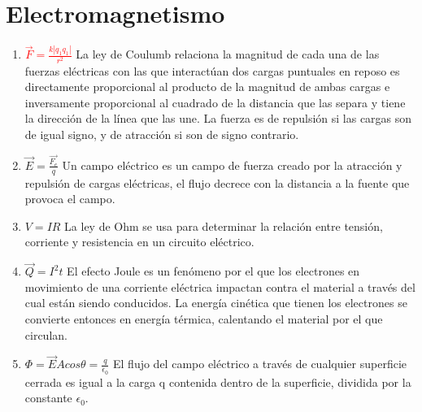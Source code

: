\documentclass[a4paper, 12pt]{article}
\begin{document}
\section{Electromagnetismo}
\begin{enumerate}
    \item [\diamond] \textcolor{red}{$\vec{F}=\frac{k|q_{1}q_{1}|}{r^{2}}$} La ley de Coulumb relaciona la magnitud de cada una de las fuerzas eléctricas con las que interactúan dos cargas puntuales en reposo es directamente proporcional al producto de la magnitud de ambas cargas e inversamente proporcional al cuadrado de la distancia que las separa y tiene la dirección de la línea que las une. La fuerza es de repulsión si las cargas son de igual signo, y de atracción si son de signo contrario.
    
    \item [\diamond] $\vec{E}=\frac{\vec{F_{e}}}{q}$ Un campo eléctrico es un campo de fuerza creado por la atracción y repulsión de cargas eléctricas, el flujo decrece con la distancia a la fuente que provoca el campo.

    \item [\diamond] $V=IR$ La ley de Ohm se usa para determinar la relación entre tensión, corriente y resistencia en un circuito eléctrico.

    \item [\diamond] $\vec{Q}=I^{2}t$ El efecto Joule es un fenómeno por el que los electrones en movimiento de una corriente eléctrica impactan contra el material a través del cual están siendo conducidos. La energía cinética que tienen los electrones se convierte entonces en energía térmica, calentando el material por el que circulan.

    \item [\diamond] $\Phi=\vec{E}Acos\theta=\frac{q}{\epsilon_{0}}$ El flujo del campo eléctrico a través de cualquier superficie cerrada es igual a la carga q contenida dentro de la superficie, dividida por la constante $\epsilon_{0}$.
    
\end{enumerate}
\end{document}
